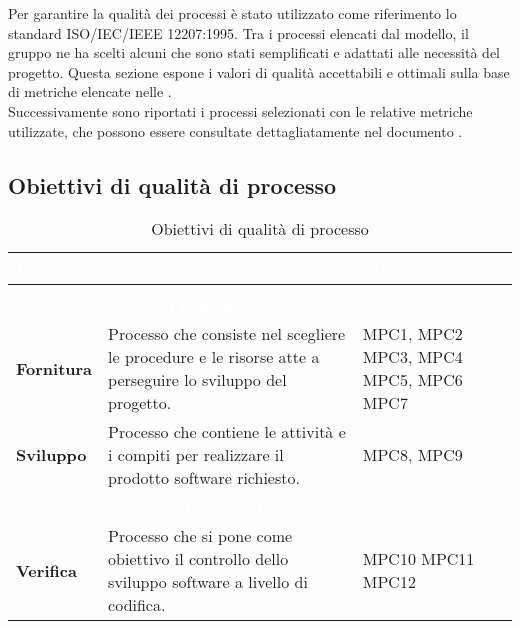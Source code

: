
Per garantire la qualità dei processi è stato utilizzato come riferimento lo standard ISO/IEC/IEEE 12207:1995. Tra i processi elencati dal modello, il gruppo ne ha scelti alcuni che sono stati semplificati e adattati alle necessità del progetto. Questa sezione espone i valori di qualità accettabili e ottimali sulla base di metriche elencate nelle \NdP{}.\\ Successivamente sono riportati i processi selezionati con le relative metriche utilizzate, che possono essere consultate dettagliatamente nel documento .

\subsection{Obiettivi di qualità di processo}
{
\setlength\arrayrulewidth{0.95pt}
\renewcommand{\arraystretch}{1.5}
\begin{longtable}{C{3cm} | C{9.5cm} | C{2.5cm}}

\textcolor{white}{\textbf{Processo}}&
\textcolor{white}{\textbf{Descrizione}}&
\textcolor{white}{\textbf{Metriche}} \\
\endfirsthead
{}\\
\endfoot
{}\caption{Obiettivi di qualità di processo}
\endlastfoot
	
 & \textcolor{white}{\textbf{Processi primari}} &  \\

	\textbf{Fornitura} &
	 Processo che consiste nel scegliere le procedure e le risorse atte a perseguire lo sviluppo del progetto. &
	MPC1, MPC2 \newline MPC3, MPC4 \newline MPC5, MPC6 \newline MPC7  \\
	
		\textbf{Sviluppo} &
	 Processo che contiene le attività e i compiti per realizzare il prodotto software richiesto. &
	MPC8, MPC9 \\
 
 & \textcolor{white}{\textbf{Processi di supporto}} &  \\
 
	\textbf{Verifica} & 
	Processo che si pone come obiettivo il controllo dello sviluppo software a livello di codifica. &
	MPC10  \newline MPC11 \newline MPC12 \\
	

\end{longtable}}
